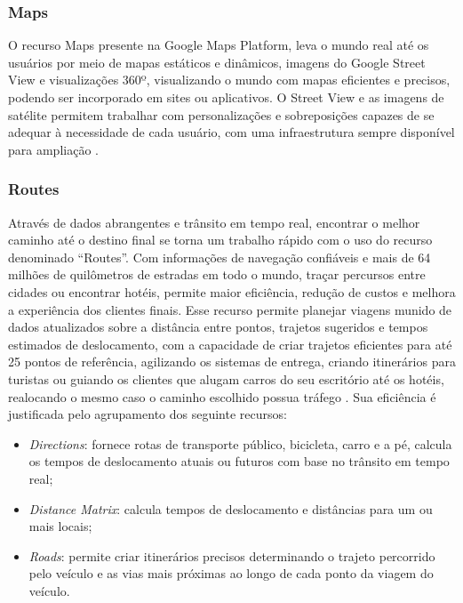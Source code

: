 \subsubsection{Maps}

O recurso Maps presente na Google Maps Platform, leva o mundo real até os usuários por meio de mapas estáticos e dinâmicos, imagens do Google Street View e visualizações 360º, visualizando o mundo com mapas eficientes e precisos, podendo ser incorporado em sites ou aplicativos. O Street View e as imagens de satélite permitem  trabalhar com personalizações e sobreposições capazes de se adequar à necessidade de cada usuário, com uma infraestrutura sempre disponível para ampliação \cite{google:2019}. 

\subsubsection{Routes}

Através de dados abrangentes e trânsito em tempo real, encontrar o melhor caminho até o destino final se torna um trabalho rápido com o uso do recurso denominado “Routes”. Com informações de navegação confiáveis e mais de 64 milhões de quilômetros de estradas em todo o mundo, traçar percursos entre cidades ou encontrar hotéis, permite maior eficiência, redução de custos e melhora a experiência dos clientes finais. Esse recurso permite planejar viagens munido de dados atualizados sobre a distância entre pontos, trajetos sugeridos e tempos estimados de deslocamento, com a capacidade de criar trajetos eficientes para até 25 pontos de referência, agilizando os sistemas de entrega, criando itinerários para turistas ou guiando os clientes que alugam carros do seu escritório até os hotéis, realocando o mesmo caso o caminho escolhido possua tráfego \cite{google:2019}. Sua eficiência é justificada pelo agrupamento dos seguinte recursos:

\newpage
\begin{itemize}
    \item \textit{Directions}: fornece rotas de transporte público, bicicleta, carro e a pé, calcula os tempos de deslocamento atuais ou futuros com base no trânsito em tempo real;
    \item \textit{Distance Matrix}: calcula tempos de deslocamento e distâncias para um ou mais locais;
    \item \textit{Roads}: permite criar itinerários precisos determinando o trajeto percorrido pelo veículo e as vias mais próximas ao longo de cada ponto da viagem do veículo.
\end{itemize}

